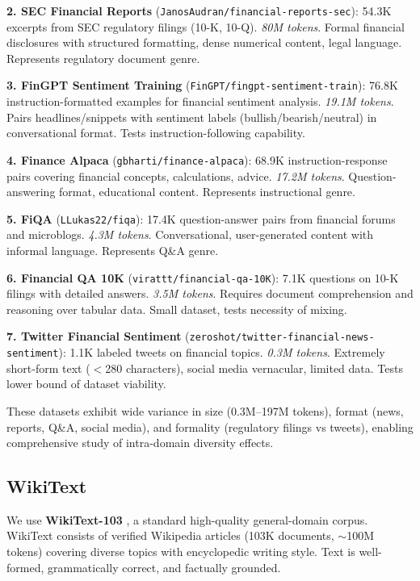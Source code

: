 \textbf{2. SEC Financial Reports} (\texttt{JanosAudran/financial-reports-sec}): 54.3K excerpts from SEC regulatory filings (10-K, 10-Q). \textit{80M tokens}. Formal financial disclosures with structured formatting, dense numerical content, legal language. Represents regulatory document genre.

\textbf{3. FinGPT Sentiment Training} (\texttt{FinGPT/fingpt-sentiment-train}): 76.8K instruction-formatted examples for financial sentiment analysis. \textit{19.1M tokens}. Pairs headlines/snippets with sentiment labels (bullish/bearish/neutral) in conversational format. Tests instruction-following capability.

\textbf{4. Finance Alpaca} (\texttt{gbharti/finance-alpaca}): 68.9K instruction-response pairs covering financial concepts, calculations, advice. \textit{17.2M tokens}. Question-answering format, educational content. Represents instructional genre.

\textbf{5. FiQA} (\texttt{LLukas22/fiqa}): 17.4K question-answer pairs from financial forums and microblogs. \textit{4.3M tokens}. Conversational, user-generated content with informal language. Represents Q\&A genre.

\textbf{6. Financial QA 10K} (\texttt{virattt/financial-qa-10K}): 7.1K questions on 10-K filings with detailed answers. \textit{3.5M tokens}. Requires document comprehension and reasoning over tabular data. Small dataset, tests necessity of mixing.

\textbf{7. Twitter Financial Sentiment} (\texttt{zeroshot/twitter-financial-news-sentiment}): 1.1K labeled tweets on financial topics. \textit{0.3M tokens}. Extremely short-form text ($<$280 characters), social media vernacular, limited data. Tests lower bound of dataset viability.

These datasets exhibit wide variance in size (0.3M--197M tokens), format (news, reports, Q\&A, social media), and formality (regulatory filings vs tweets), enabling comprehensive study of intra-domain diversity effects.

\subsection{WikiText}

We use \textbf{WikiText-103} \parencite{merity2016pointer}, a standard high-quality general-domain corpus. WikiText consists of verified Wikipedia articles (103K documents, $\sim$100M tokens) covering diverse topics with encyclopedic writing style. Text is well-formed, grammatically correct, and factually grounded.

